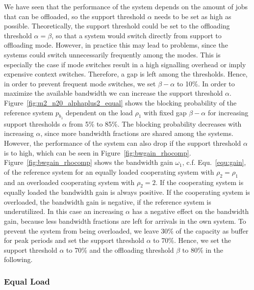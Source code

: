 We have seen that the performance of the system depends on the amount of jobs that can be offloaded, so the support threshold $\alpha$ needs to be set as high as possible. Theoretically, the support threshold could be set to the offloading threshold $\alpha=\beta$, so that a system would switch directly from support to offloading mode. However, in practice this may lead to problems, since the systems could switch unnecessarily frequently among the modes. This is especially the case if mode switches result in a high signalling overhead or imply expensive context switches. Therefore, a gap is left among the thresholds.
Hence, in order to prevent frequent mode switches, we set $\beta - \alpha$ to 10\%. In order to maximize the available bandwidth we can increase the support threshold $\alpha$.
Figure~\ref{fig:m2_n20_alphaplus2_equal} shows the blocking probability of the reference system $p_{b_1}$ dependent on the load $\rho_1$ with fixed gap $\beta-\alpha$ for increasing support thresholds $\alpha$ from 5\% to 85\%. The blocking probability decreases with increasing $\alpha$, since more bandwidth fractions are shared among the systems.
However, the performance of the system can also drop if the support threshold $\alpha$ is to high, which can be seen in Figure~\ref{fig:bwgain_rhocomp}. Figure~\ref{fig:bwgain_rhocomp} shows the bandwidth gain $\omega_1$, c.f. Equ.~\ref{equ:gain}, of the reference system for an equally loaded cooperating system with $\rho_2=\rho_1$ and an overloaded cooperating system with $\rho_2=2$. If the cooperating system is equally loaded the bandwidth gain is always positive. If the cooperating system is overloaded, the bandwidth gain is negative, if the reference system is underutilized. In this case an increasing $\alpha$ has a negative effect on the bandwidth gain, because less bandwidth fractions are left for arrivals in the own system.
To prevent the system from being overloaded, we leave 30\% of the capacity as buffer for peak periods and set the support threshold $\alpha$ to 70\%.
Hence, we set the support threshold $\alpha$ to 70\% and the offloading threshold $\beta$ to 80\% in the following.

\subsubsection*{Equal Load}

